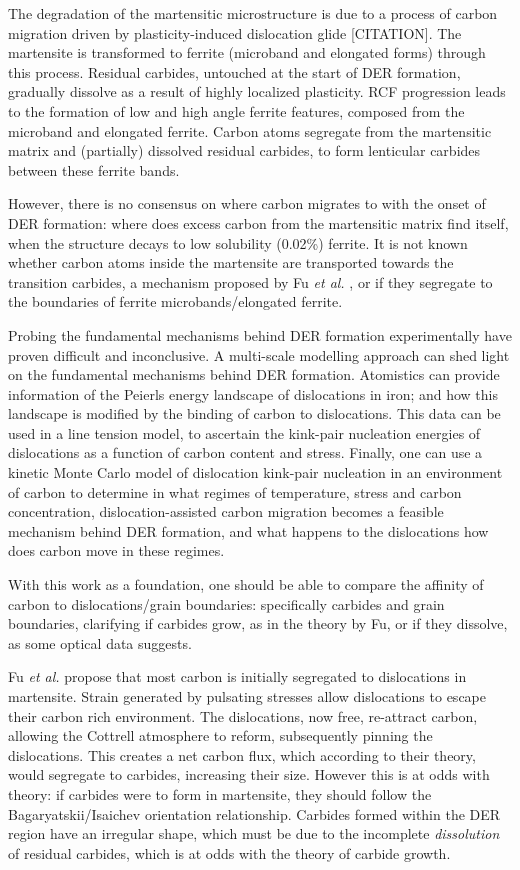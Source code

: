 \documentclass[a4paper]{article}
\begin{document}
The degradation of the martensitic microstructure is due to a process of carbon migration driven
by plasticity-induced dislocation glide [CITATION]. The martensite is transformed to ferrite (microband
and elongated forms) through this process. Residual carbides, untouched at the start of DER
formation, gradually dissolve as a result of highly localized plasticity. RCF progression
leads to the formation of low and high angle ferrite features, composed from the microband and elongated
ferrite. Carbon atoms segregate from the martensitic matrix and (partially) dissolved
residual carbides, to form lenticular carbides between these ferrite bands. 

However, there is no consensus on where carbon migrates to with the onset of DER formation: where
does excess carbon from the martensitic matrix find itself, when the structure decays to low solubility (0.02\%)
ferrite. It is not known whether carbon atoms inside the martensite are transported towards the
transition carbides, a mechanism proposed by Fu \emph{et al.}
\cite{fu17_strain_induc_marten_decay_bearin,Fu2017}, or if they segregate to the boundaries of ferrite
microbands/elongated ferrite.

Probing the fundamental mechanisms behind DER formation experimentally have proven difficult and
inconclusive. A multi-scale modelling approach can shed light on the fundamental mechanisms behind
DER formation. Atomistics can provide information of the Peierls energy landscape of dislocations
in iron; and how this landscape is modified by the binding of carbon to dislocations. This data can be used in a
line tension model, to ascertain the kink-pair nucleation energies of dislocations as a function of carbon content and
stress. Finally, one can use a kinetic Monte Carlo model of dislocation kink-pair nucleation in an
environment of carbon to determine in what regimes of temperature, stress and carbon
concentration, dislocation-assisted carbon migration becomes a feasible mechanism behind DER
formation, and what happens to the dislocations how does carbon move in these
regimes. 

With this work as a foundation, one should be able to compare the affinity of carbon to
dislocations/grain boundaries: specifically carbides and grain boundaries, clarifying if carbides
grow, as in the theory by Fu, or if they dissolve, as some optical data suggests. 


Fu \emph{et al.} propose that most carbon is initially segregated to dislocations in martensite. Strain
generated by pulsating stresses allow dislocations to escape their carbon rich
environment. The dislocations, now free, re-attract carbon, allowing the Cottrell atmosphere to
reform, subsequently pinning the dislocations. This creates a net carbon flux, which according to
their theory, would segregate to carbides, increasing their size. However this is at odds with
theory: if carbides were to form in martensite, they should follow the Bagaryatskii/Isaichev
orientation relationship. Carbides formed within the DER region have an irregular shape, which
must be due to the incomplete \emph{dissolution} of residual carbides, which is at odds with the theory
of carbide growth. 
\end{document}
